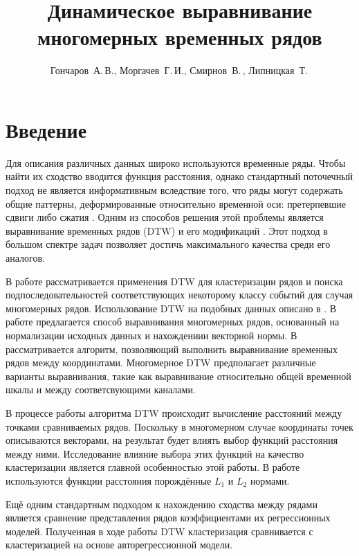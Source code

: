 \documentclass[12pt,twoside]{article}
\title
        {Динамическое выравнивание многомерных временных рядов}
\author
        {Гончаров~А.\,В., Моргачев~Г.\,И., Смирнов~В.\,, Липницкая~Т.\,} %
\begin{document}
    \maketitle
    \setcounter{secnumdepth}{3}
    \section{Введение}\label{intro}
        
        Для описания различных данных широко используются временные ряды.
        Чтобы найти их сходство вводится функция расстояния, однако стандартный поточечный подход не является информативным вследствие того,
        что ряды могут содержать общие паттерны, деформированные относительно временной оси: претерпевшие сдвиги либо сжатия \cite{01f4ab11a9ff49ff909094a135dcfe33}.
        Одним из способов решения этой проблемы является выравнивание временных рядов (DTW)  \cite{Keogh01derivativedynamic} и его модификаций \cite{journals/ida/SalvadorC07}.
        Этот подход в большом спектре задач позволяет достичь максимального качества среди его аналогов.
        
        В работе рассматривается применения DTW для кластеризации рядов и поиска подпоследовательностей
        соответствующих некоторому классу событий для случая многомерных рядов.
        Использование DTW на подобных данных описано в \cite{Holt2007,Sanguansat2012MultipleMS}.
        В работе \cite{Holt2007} предлагается способ выравнивания многомерных рядов, основанный на нормализации исходных данных и нахождениии векторной нормы.
        В \cite{Sanguansat2012MultipleMS} рассматривается алгоритм, позволяющий выполнить выравнивание временных рядов между координатами. 
        Многомерное DTW предполагает различные варианты выравнивания, такие как выравнивание относительно общей временной шкалы и между соответсвующими каналами.
        
        В процессе работы алгоритма DTW происходит вычисление расстояний между точками сравниваемых рядов.
        Поскольку в многомерном случае координаты точек описываются векторами, на результат будет влиять выбор функций расстояния между ними.
        Исследование влияние выбора этих функций на качество кластеризации является главной особенностью этой работы.
        В работе используются функции расстояния порождённые $L_1$ и $L_2$ нормами.
        
        Ещё одним стандартным подходом к нахождению сходства между рядами является сравнение представления рядов коэффициентами их регрессионных моделей.
        Полученная в ходе работы DTW кластеризация сравнивается с кластеризацией на основе авторегрессионной модели.
    
\end{document}
